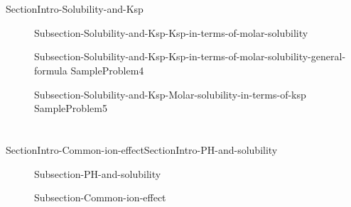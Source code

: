 \documentclass[main.tex]{subfiles}
\newcommand\chapterlabel{Ch-solubility}\setcounter{figurenewcounter}{0}\setcounter{tablenewcounter}{0}\setcounter{formulanewcounter}{0}\chapterpicture{../{\chapterlabel}/figure1}\chapterpicturelabel{imaggeo.egu.eu/view/195/}
\begin{document}
\section{}  {SectionIntro-Solubility-and-Ksp}
\sloppy\begin{description}
\item[]  {Subsection-Solubility-and-Ksp-Ksp-in-terms-of-molar-solubility}
\item[] {Subsection-Solubility-and-Ksp-Ksp-in-terms-of-molar-solubility-general-formula}
{SampleProblem4}
\item[] {Subsection-Solubility-and-Ksp-Molar-solubility-in-terms-of-ksp}
{SampleProblem5}
\end{description}



\section{\color{blue!30!black}{Solubility , PH and common ion effect}} {SectionIntro-Common-ion-effect}{SectionIntro-PH-and-solubility}
\sloppy\begin{description}
\item[] {Subsection-PH-and-solubility}
\item[]{Subsection-Common-ion-effect}
\end{description}
\end{document}
